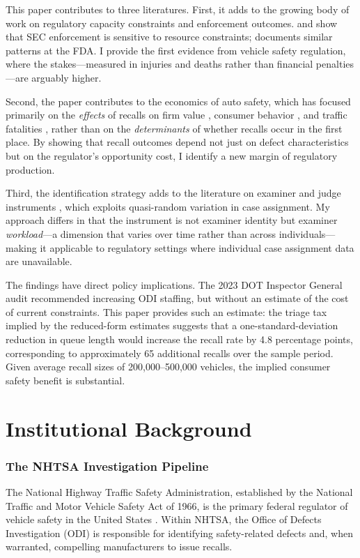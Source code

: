 \documentclass[12pt]{article}
\begin{document}
This paper contributes to three literatures. First, it adds to the growing body of work on regulatory capacity constraints and enforcement outcomes. \citet{kang2016regulatory} and \citet{heese2016waiting} show that SEC enforcement is sensitive to resource constraints; \citet{macher2007regulation} documents similar patterns at the FDA. I provide the first evidence from vehicle safety regulation, where the stakes---measured in injuries and deaths rather than financial penalties---are arguably higher.

Second, the paper contributes to the economics of auto safety, which has focused primarily on the \textit{effects} of recalls on firm value \citep{jarrell1985wealth, barber1996product, hoffer1988impact}, consumer behavior \citep{bae2004consumers, liu2016production}, and traffic fatalities \citep{peltzman1975automobile, levitt2001how}, rather than on the \textit{determinants} of whether recalls occur in the first place. By showing that recall outcomes depend not just on defect characteristics but on the regulator's opportunity cost, I identify a new margin of regulatory production.

Third, the identification strategy adds to the literature on examiner and judge instruments \citep{kling2006incarceration, dobbie2018effects, sampat2019examiner, rigbi2023examiner}, which exploits quasi-random variation in case assignment. My approach differs in that the instrument is not examiner identity but examiner \textit{workload}---a dimension that varies over time rather than across individuals---making it applicable to regulatory settings where individual case assignment data are unavailable.

The findings have direct policy implications. The 2023 DOT Inspector General audit recommended increasing ODI staffing, but without an estimate of the cost of current constraints. This paper provides such an estimate: the triage tax implied by the reduced-form estimates suggests that a one-standard-deviation reduction in queue length would increase the recall rate by 4.8 percentage points, corresponding to approximately 65 additional recalls over the sample period. Given average recall sizes of 200,000--500,000 vehicles, the implied consumer safety benefit is substantial.

\section{Institutional Background}

\subsubsection*{The NHTSA Investigation Pipeline} The National Highway Traffic Safety Administration, established by the National Traffic and Motor Vehicle Safety Act of 1966, is the primary federal regulator of vehicle safety in the United States \citep{mashaw2002struggle}. Within NHTSA, the Office of Defects Investigation (ODI) is responsible for identifying safety-related defects and, when warranted, compelling manufacturers to issue recalls.
\end{document}

